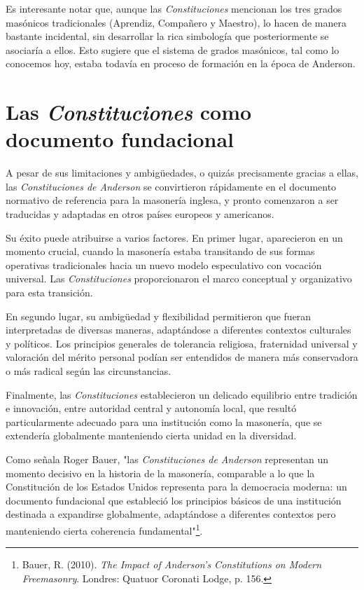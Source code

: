\documentclass[a4paper,12pt,twoside]{book}
\begin{document}
Es interesante notar que, aunque las \textit{Constituciones} mencionan los tres grados masónicos tradicionales (Aprendiz, Compañero y Maestro), lo hacen de manera bastante incidental, sin desarrollar la rica simbología que posteriormente se asociaría a ellos. Esto sugiere que el sistema de grados masónicos, tal como lo conocemos hoy, estaba todavía en proceso de formación en la época de Anderson.

\section{Las \textit{Constituciones} como documento fundacional}

A pesar de sus limitaciones y ambigüedades, o quizás precisamente gracias a ellas, las \textit{Constituciones de Anderson} se convirtieron rápidamente en el documento normativo de referencia para la masonería inglesa, y pronto comenzaron a ser traducidas y adaptadas en otros países europeos y americanos.

Su éxito puede atribuirse a varios factores. En primer lugar, aparecieron en un momento crucial, cuando la masonería estaba transitando de sus formas operativas tradicionales hacia un nuevo modelo especulativo con vocación universal. Las \textit{Constituciones} proporcionaron el marco conceptual y organizativo para esta transición.

En segundo lugar, su ambigüedad y flexibilidad permitieron que fueran interpretadas de diversas maneras, adaptándose a diferentes contextos culturales y políticos. Los principios generales de tolerancia religiosa, fraternidad universal y valoración del mérito personal podían ser entendidos de manera más conservadora o más radical según las circunstancias.

Finalmente, las \textit{Constituciones} establecieron un delicado equilibrio entre tradición e innovación, entre autoridad central y autonomía local, que resultó particularmente adecuado para una institución como la masonería, que se extendería globalmente manteniendo cierta unidad en la diversidad.

Como señala Roger Bauer, "las \textit{Constituciones de Anderson} representan un momento decisivo en la historia de la masonería, comparable a lo que la Constitución de los Estados Unidos representa para la democracia moderna: un documento fundacional que estableció los principios básicos de una institución destinada a expandirse globalmente, adaptándose a diferentes contextos pero manteniendo cierta coherencia fundamental"\footnote{Bauer, R. (2010). \textit{The Impact of Anderson's Constitutions on Modern Freemasonry}. Londres: Quatuor Coronati Lodge, p. 156.}.
\end{document}
